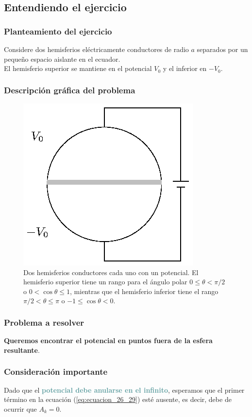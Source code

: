 \documentclass[12pt]{beamer}
\begin{document}
\subsection{Entendiendo el ejercicio}

\begin{frame}
\frametitle{Planteamiento del ejercicio}
Considere dos hemisferios eléctricamente conductores de radio $a$ separados por un pequeño espacio aislante en el ecuador. 
\\
\bigskip
\pause
El hemisferio superior se mantiene en el potencial $V_{0}$ y el inferior en $-V_{0}$.
\end{frame}
\begin{frame}
\frametitle{Descripción gráfica del problema}
\begin{figure}[H]
    \centering
    \includegraphics[scale=1]{Imagenes/Ejemplo_Esfera_03.eps}
    \caption{Dos hemisferios conductores cada uno con un potencial. El hemisferio superior tiene un rango para el ángulo polar $0 \leq \theta < \pi/2$ o $0 < \cos \theta \leq 1$, mientras que el hemisferio inferior tiene el rango $\pi/2 < \theta \leq \pi $ o $-1 \leq \cos \theta < 0$.}
    \label{fig_figura_esfera_03}
\end{figure}
\end{frame}
\begin{frame}
\frametitle{Problema a resolver}
\textbf{Queremos encontrar el potencial en puntos fuera de la esfera resultante}.
\end{frame}
\begin{frame}
\frametitle{Consideración importante}
Dado que el \textbf{\textcolor{cadetblue}{potencial debe anularse en el infinito}}, \pause esperamos que el primer término en la ecuación (\ref{eq:ecuacion_26_29}) esté ausente, \pause es decir, debe de ocurrir que $A_{k} = 0$.
\end{frame}
\end{document}
